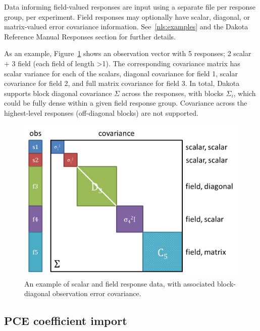 Data informing field-valued responses are input using a separate file
per response group, per experiment.  Field responses may optionally
have scalar, diagonal, or matrix-valued error covariance information.
See~\ref{nls:examples} and the Dakota Reference Manual Responses
section for further details.

As an example, Figure~\ref{fig:input:obs_err_cov} shows an observation
vector with 5 responses; 2 scalar + 3 field (each field of length
\textgreater 1).  The corresponding covariance matrix has scalar
variance for each of the scalars, diagonal covariance for field 1,
scalar covariance for field 2, and full matrix covariance for field 3.
In total, Dakota supports block diagonal covariance $\Sigma$ across
the responses, with blocks $\Sigma_i$, which could be fully dense
within a given field response group.  Covariance across the
highest-level responses (off-diagonal blocks) are not supported.
\begin{figure}[htbp!]
  \centering
  \includegraphics[scale=0.5]{images/ObsErrorCovariance}
  \caption{An example of scalar and field response data, with
    associated block-diagonal observation error covariance.}
  \label{fig:input:obs_err_cov}
\end{figure}

\subsection{PCE coefficient import}

